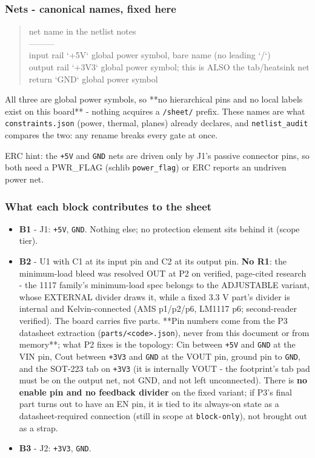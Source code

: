 \documentclass[11pt,a4paper]{article}
\begin{document}
\subsubsection*{Nets - canonical names, fixed here}
\begin{quote}\small\ttfamily\raggedright
\textbar{} net \textbar{} name in the netlist \textbar{} notes \textbar{}\\
\textbar{}---\textbar{}---\textbar{}---\textbar{}\\
\textbar{} input rail \textbar{} `+5V` \textbar{} global power symbol, bare name (no leading `/`) \textbar{}\\
\textbar{} output rail \textbar{} `+3V3` \textbar{} global power symbol; this is ALSO the tab/heatsink net \textbar{}\\
\textbar{} return \textbar{} `GND` \textbar{} global power symbol \textbar{}
\end{quote}
All three are global power symbols, so {*}{*}no hierarchical pins and no local labels exist on this board{*}{*} - nothing acquires a \texttt{/sheet/} prefix. These names are what \texttt{constraints.json} (power, thermal, planes) already declares, and \texttt{netlist\_audit} compares the two: any rename breaks every gate at once.

ERC hint: the \texttt{+5V} and \texttt{GND} nets are driven only by J1's passive connector pins, so both need a PWR\_FLAG (schlib \texttt{power\_flag}) or ERC reports an undriven power net.

\subsubsection*{What each block contributes to the sheet}
\begin{itemize}
\item \textbf{B1} - J1: \texttt{+5V}, \texttt{GND}. Nothing else; no protection element sits behind it
(scope tier).
\item \textbf{B2} - U1 with C1 at its input pin and C2 at its output pin. \textbf{No R1}: the
minimum-load bleed was resolved OUT at P2 on verified, page-cited research -
the 1117 family's minimum-load spec belongs to the ADJUSTABLE variant, whose
EXTERNAL divider draws it, while a fixed 3.3 V part's divider is internal and
Kelvin-connected (AMS p1/p2/p6, LM1117 p6; second-reader verified). The board
carries five parts. {*}{*}Pin numbers come from the P3 datasheet
extraction (\texttt{parts/\textless{}code\textgreater{}.json}), never from this document or from memory{*}{*};
what P2 fixes is the topology: Cin between \texttt{+5V} and \texttt{GND} at the VIN pin,
Cout between \texttt{+3V3} and \texttt{GND} at the VOUT pin, ground pin to \texttt{GND}, and the
SOT-223 tab on \texttt{+3V3} (it is internally VOUT - the footprint's tab pad must
be on the output net, not GND, and not left unconnected).
There is \textbf{no enable pin and no feedback divider} on the fixed variant; if
P3's final part turns out to have an EN pin, it is tied to its always-on
state as a datasheet-required connection (still in scope at \texttt{block-only}),
not brought out as a strap.
\item \textbf{B3} - J2: \texttt{+3V3}, \texttt{GND}.
\end{itemize}
\end{document}
